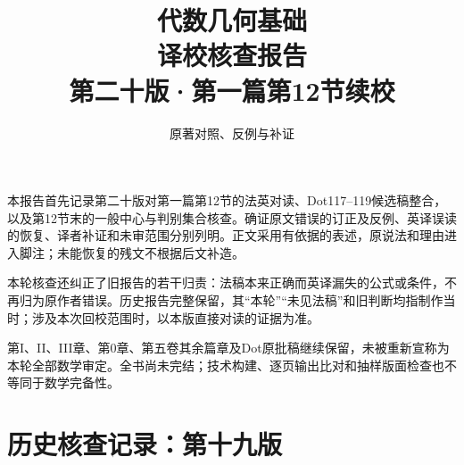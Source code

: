 
\newcommand{\RR}{\mathcal R}
\newcommand{\FF}{\mathcal F}
\newcommand{\GG}{\mathcal G}
\newcommand{\MM}{\mathcal M}
\newcommand{\JJ}{\mathcal J}
\newcommand{\oldauditsrc}[1]{\par\noindent\textbf{原文位置：}#1。\par}
\newcommand{\kind}[2]{\noindent\textbf{分类：#1。}\ #2\par}
\newcommand{\lead}[1]{\par\noindent\textbf{#1}\quad}
\newenvironment{analysisproof}{\par\noindent\textbf{该轮核查的反例或补证。}\ }{\par}

\title{代数几何基础\\译校核查报告\\[1em]\large 第二十版·第一篇第12节续校}
\author{原著对照、反例与补证}
\date{}

\frontmatter
\maketitle
{}
本报告首先记录第二十版对第一篇第12节的法英对读、Dot117--119候选稿整合，以及第12节末的一般中心与判别集合核查。确证原文错误的订正及反例、英译误读的恢复、译者补证和未审范围分别列明。正文采用有依据的表述，原说法和理由进入脚注；未能恢复的残文不根据后文补造。

本轮核查还纠正了旧报告的若干归责：法稿本来正确而英译漏失的公式或条件，不再归为原作者错误。历史报告完整保留，其“本轮”“未见法稿”和旧判断均指制作当时；涉及本次回校范围时，以本版直接对读的证据为准。

第I、II、III章、第0章、第五卷其余篇章及Dot原批稿继续保留，未被重新宣称为本轮全部数学审定。全书尚未完结；技术构建、逐页输出比对和抽样版面检查也不等同于数学完备性。

\tableofcontents
\mainmatter





\setcounter{secnumdepth}{-2}
\part{历史核查记录：第十九版}
\setcounter{secnumdepth}{2}





\setcounter{secnumdepth}{-2}
